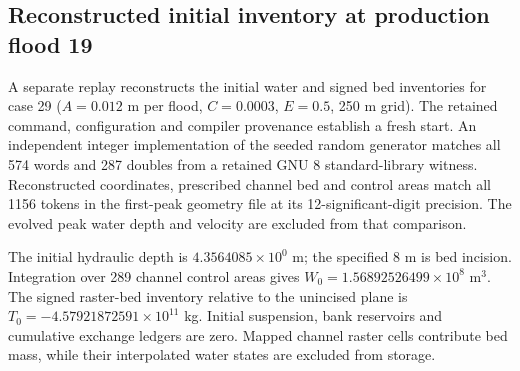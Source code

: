 \subsection{Reconstructed initial inventory at production flood 19}
A separate replay reconstructs the initial water and signed bed inventories
for case 29 ($A=0.012$ m per flood, $C=0.0003$, $E=0.5$, 250 m grid).
The retained command, configuration and compiler provenance establish a
fresh start. An independent integer implementation of the seeded random
generator matches all 574 words and 287 doubles from a retained GNU 8
standard-library witness. Reconstructed coordinates, prescribed channel
bed and control areas match all 1156 tokens in the first-peak geometry
file at its 12-significant-digit precision. The evolved peak water
depth and velocity are excluded from that comparison.

The initial hydraulic depth is $4.3564085\times10^{0}$ m; the specified 8 m is bed incision.
Integration over 289 channel control areas gives $W_0=1.56892526499\times10^{8}$ m$^3$.
The signed raster-bed inventory relative to the unincised plane is
$T_0=-4.57921872591\times10^{11}$ kg. Initial suspension, bank reservoirs and cumulative
exchange ledgers are zero. Mapped channel raster cells contribute bed
mass, while their interpolated water states are excluded from storage.

